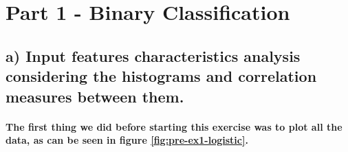\documentclass[a4paper]{article}
\begin{document}
\section{Part 1 - Binary Classification}

\subsection{a) Input features characteristics analysis considering the histograms and correlation measures between them.}

\paragraph{The first thing we did before starting this exercise was to plot all the data, as can be seen in figure \ref{fig:pre-ex1-logistic}.}


\end{document}
